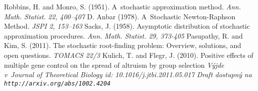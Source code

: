 \begin{thebibliography}{9}
Robbins, H. and Monro, S. (1951).
A~stochastic approximation method.
\textit{Ann. Math. Statist. 22, 400--407}
D. Anbar (1978).
A~Stochastic Newton-Raphson Method.
\textit{JSPI 2, 153--163}
Sacks, J. (1958).
Asymptotic distribution of stochastic approximation procedures.
\textit{Ann. Math. Statist. 29, 373-405}
Pasupathy, R. and Kim, S. (2011).
The stochastic root-finding problem: Overview, solutions, and open questions.
\textit{TOMACS 22/3}
Kulich, T. and Flegr, J. (2010).
Positive effects of multiple gene control on the spread of altruism by group selection
\textit{Výjde v~Journal of Theoretical Biology id: 10.1016/j.jtbi.2011.05.017}
\textit{Draft dostupný na \texttt{http://arxiv.org/abs/1002.4204}}
\end{thebibliography}
